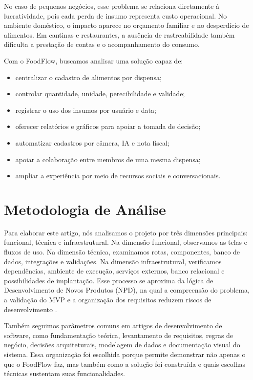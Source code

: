 \documentclass[12pt]{article}
\begin{document}
No caso de pequenos negócios, esse problema se relaciona diretamente à lucratividade, pois cada perda de insumo representa custo operacional. No ambiente doméstico, o impacto aparece no orçamento familiar e no desperdício de alimentos. Em cantinas e restaurantes, a ausência de rastreabilidade também dificulta a prestação de contas e o acompanhamento do consumo.

Com o FoodFlow, buscamos analisar uma solução capaz de:

\begin{itemize}
    \item centralizar o cadastro de alimentos por dispensa;
    \item controlar quantidade, unidade, perecibilidade e validade;
    \item registrar o uso dos insumos por usuário e data;
    \item oferecer relatórios e gráficos para apoiar a tomada de decisão;
    \item automatizar cadastros por câmera, IA e nota fiscal;
    \item apoiar a colaboração entre membros de uma mesma dispensa;
    \item ampliar a experiência por meio de recursos sociais e conversacionais.
\end{itemize}

\section{Metodologia de Análise}

Para elaborar este artigo, nós analisamos o projeto por três dimensões principais: funcional, técnica e infraestrutural. Na dimensão funcional, observamos as telas e fluxos de uso. Na dimensão técnica, examinamos rotas, componentes, banco de dados, integrações e validações. Na dimensão infraestrutural, verificamos dependências, ambiente de execução, serviços externos, banco relacional e possibilidades de implantação. Esse processo se aproxima da lógica de Desenvolvimento de Novos Produtos (NPD), na qual a compreensão do problema, a validação do MVP e a organização dos requisitos reduzem riscos de desenvolvimento \cite{falahat2024}.

Também seguimos parâmetros comuns em artigos de desenvolvimento de software, como fundamentação teórica, levantamento de requisitos, regras de negócio, decisões arquiteturais, modelagem de dados e documentação visual do sistema. Essa organização foi escolhida porque permite demonstrar não apenas o que o FoodFlow faz, mas também como a solução foi construída e quais escolhas técnicas sustentam suas funcionalidades.
\end{document}
